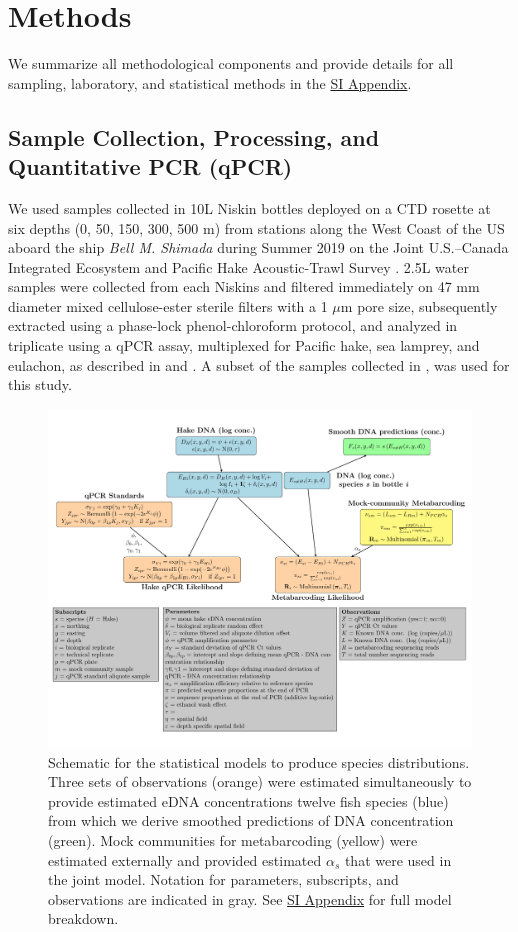 \documentclass{article}
\begin{document}
\section{Methods}
We summarize all methodological components and provide details for all sampling, laboratory, and statistical methods in the \href{SI_Appendix.pdf}{SI Appendix}.

\subsection*{Sample Collection, Processing, and Quantitative PCR (qPCR)}
We used samples collected in 10L Niskin bottles deployed on a CTD rosette at six depths (0, 50, 150, 300, 500 m) from stations along the West Coast of the US aboard the ship \textit{Bell M. Shimada} during Summer 2019 on the Joint U.S.–Canada Integrated Ecosystem and Pacific Hake Acoustic-Trawl Survey \cite{deblois2020}. 2.5L water samples were collected from each Niskins and filtered immediately on 47 mm diameter mixed cellulose-ester sterile filters with a 1 $\mu$m pore size, subsequently extracted using a phase-lock phenol-chloroform protocol, and analyzed in triplicate using a qPCR assay, multiplexed for Pacific hake, sea lamprey, and eulachon, as described in \cite{ramon-laca2021} and \cite{shelton2022}. A subset of the samples collected in \cite{shelton2022}, was used for this study. 

\begin{figure}[tbhp] 
\centering
\includegraphics[width=16cm]{plots/DAG-Ole.pdf} 
\caption{Schematic for the statistical models to produce species distributions. Three sets of observations (orange) were estimated simultaneously to provide estimated eDNA concentrations twelve fish species (blue) from which we derive smoothed predictions of DNA concentration (green). Mock communities for metabarcoding (yellow) were estimated externally and provided estimated $\alpha_s$ that were used in the joint model. Notation for parameters, subscripts, and observations are indicated in gray. See \href{SI_Appendix.pdf}{SI Appendix} for full model breakdown.}
\label{fig:DAG2}
\end{figure}
\end{document}
